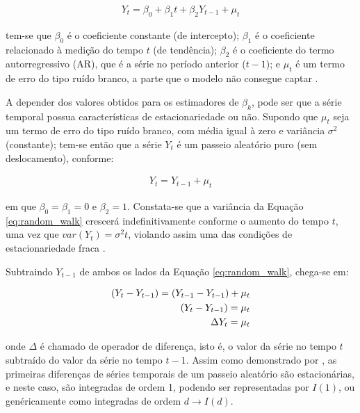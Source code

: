 \begin{ceqn}
\begin{align} \label{eq:ts_generic_model}
 Y_{t} = \beta_{0} + \beta_{1} t + \beta_{2} Y_{t-1} + \mu_{t}
\end{align}
\end{ceqn} tem-se que $\beta_{0}$ é o coeficiente constante (de intercepto); $\beta_{1}$ é o coeficiente relacionado à medição do tempo $t$ (de tendência); $\beta_{2}$ é o coeficiente do termo autorregressivo (AR), que é a série no período anterior ($t-1$); e $\mu_{t}$ é um termo de erro do tipo ruído branco, a parte que o modelo não consegue captar \cite{gujarati_ecn2011}.

A depender dos valores obtidos para os estimadores de $\beta_{k}$, pode ser que a série temporal possua características de estacionariedade ou não. Supondo que $\mu_{t}$ seja um termo de erro do tipo ruído branco, com média igual à zero e variância $\sigma^2$ (constante); tem-se então que a série $Y_{t}$ é um passeio aleatório puro (sem deslocamento), conforme:

\begin{ceqn}
\begin{align} \label{eq:random_walk}
 Y_{t} = Y_{t-1} + \mu_{t}
\end{align}
\end{ceqn} em que $\beta_{0} = \beta_{1} = 0$ e $\beta_{2} = 1$. Constata-se que a variância da Equação \eqref{eq:random_walk} crescerá indefinitivamente conforme o aumento do tempo $t$, uma vez que $var(Y_{t}) = \sigma^2 t$, violando assim uma das condições de estacionariedade fraca \cite{gujarati_ecn2011}.

Subtraindo $Y_{t-1}$ de ambos os lados da Equação \eqref{eq:random_walk}, chega-se em:

\begin{ceqn}
\begin{align} \label{eq:rw_diff}
(Y_{t} - Y_{t-1}) = (Y_{t-1} - Y_{t-1}) + \mu_{t} \notag \\
(Y_{t} - Y_{t-1}) = \mu_{t} \notag \\
\Delta Y_{t} = \mu_{t}
\end{align}
\end{ceqn} onde $\Delta$ é chamado de operador de diferença, isto é, o valor da série no tempo $t$ subtraído do valor da série no tempo $t-1$. Assim como demonstrado por , as primeiras diferenças de séries temporais de um passeio aleatório são estacionárias, e neste caso, são integradas de ordem 1, podendo ser representadas por $I(1)$, ou genéricamente como integradas de ordem $d \rightarrow I(d)$.

